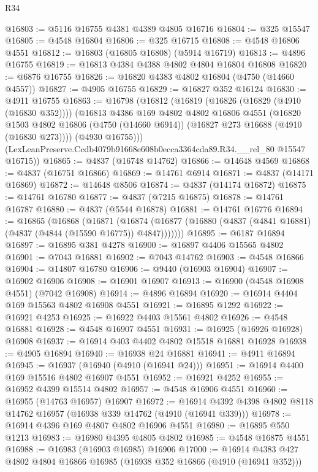 \begin{lexlean}{R34}
\begin{coremodule}
@16803 := @5116 @16755 @4381 @4389 @4805 @16716
@16804 := @325 @15547
@16805 := @4548 @16804
@16806 := @325 @16715
@16808 := @4548 @16806 @4551
@16812 := @16803 (@16805 @16808) (@5914 @16719)
@16813 := @4896 @16755
@16819 := @16813 @4384 @4388 @4802 @4804 @16804 @16808
@16820 := @6876 @16755
@16826 := @16820 @4383 @4802 @16804 (@4750 (@14660 @4557))
@16827 := @4905 @16755
@16829 := @16827 @352 @16124
@16830 := @4911 @16755
@16863 := @16798
    (@16812
      (@16819
        (@16826 (@16829 (@4910 (@16830 @352))))
        (@16813
          @4386
          @169
          @4802
          @4802
          @16806
          @4551
          (@16820
            @1503
            @4802
            @16806
            (@4750 (@14660 @6914))
            (@16827 @273 @16688 (@4910 (@16830 @273))))
          (@4930 @16755)))
      (LexLeanPreserve.Ccdb4079b91668e608b0ecca3364cda89.R34.__rel_80 @15547 @16715))
@16865 := @4837 (@16748 @14762)
@16866 := @14648 @4569
@16868 := @4837 (@16751 @16866)
@16869 := @14761 @6914
@16871 := @4837 (@14171 @16869)
@16872 := @14648 @8506
@16874 := @4837 (@14174 @16872)
@16875 := @14761 @16780
@16877 := @4837 (@7215 @16875)
@16878 := @14761 @16787
@16880 := @4837 (@5544 @16878)
@16881 := @14761 @16776
@16894 := @16865
    (@16868
      (@16871
        (@16874 (@16877 (@16880 (@4837 (@4841 @16881) (@4837 (@4844 (@15590 @16775)) @4847)))))))
@16895 := @6187 @16894
@16897 := @16895 @381 @4278
@16900 := @16897 @4406 @15565 @4802
@16901 := @7043 @16881
@16902 := @7043 @14762
@16903 := @4548 @16866
@16904 := @14807 @16780
@16906 := @9440 (@16903 @16904)
@16907 := @16902 @16906
@16908 := @16901 @16907
@16913 := @16900 (@4548 @16908 @4551) (@7042 @16908)
@16914 := @4896 @16894
@16920 := @16914 @4404 @169 @15563 @4802 @16908 @4551
@16921 := @16895 @1292
@16922 := @16921 @4253
@16925 := @16922 @4403 @15561 @4802
@16926 := @4548 @16881
@16928 := @4548 @16907 @4551
@16931 := @16925 (@16926 @16928) @16908
@16937 := @16914 @403 @4402 @4802 @15518 @16881 @16928
@16938 := @4905 @16894
@16940 := @16938 @24 @16881
@16941 := @4911 @16894
@16945 := @16937 (@16940 (@4910 (@16941 @24)))
@16951 := @16914 @4400 @169 @15516 @4802 @16907 @4551
@16952 := @16921 @4252
@16955 := @16952 @4399 @15514 @4802
@16957 := @4548 @16906 @4551
@16960 := @16955 (@14763 @16957) @16907
@16972 := @16914 @4392 @4398 @4802 @8118 @14762 @16957 (@16938 @339 @14762 (@4910 (@16941 @339)))
@16978 := @16914 @4396 @169 @4807 @4802 @16906 @4551
@16980 := @16895 @550 @1213
@16983 := @16980 @4395 @4805 @4802
@16985 := @4548 @16875 @4551
@16988 := @16983 (@16903 @16985) @16906
@17000 := @16914 @4383 @427 @4802 @4804 @16866 @16985 (@16938 @352 @16866 (@4910 (@16941 @352)))

\end{coremodule}
\end{lexlean}
